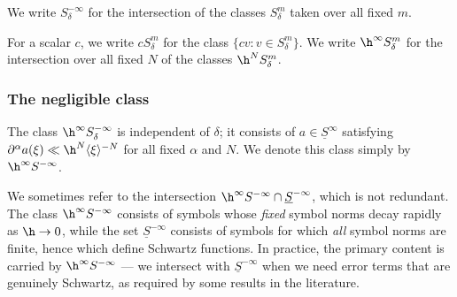 We write $S_{\delta}^{-\infty}$ for the intersection of the classes $S^m_\delta$ taken over all fixed $m$.

For a scalar $c$, we write $c S_\delta^m$ for the class $\{c v : v \in S_\delta^m\}$.  We write $\h^\infty S_\delta^m$ for the intersection over all fixed $N$ of the classes $\h^N S_\delta^m$.

\subsubsection{The negligible class}
The class $\h^\infty S_\delta^{-\infty}$ is independent of $\delta$; it consists of $a \in \underline{S}^\infty$ satisfying $\partial^\alpha a(\xi) \ll \h^N \langle \xi  \rangle^{-N}$ for all fixed $\alpha$ and $N$.  We denote this class simply by $\h^\infty S^{-\infty}$.   

\begin{remark}
  We sometimes refer to the intersection $\h^\infty S^{-\infty} \cap \underline{S}^{-\infty}$, which is not redundant.  The class $\h^\infty S^{-\infty}$ consists of symbols whose \emph{fixed} symbol norms decay rapidly as $\h \rightarrow 0$, while the set $\underline{S}^{-\infty}$ consists of symbols for which \emph{all} symbol norms are finite, hence which define Schwartz functions.  In practice, the primary content is carried by $\h^\infty S^{-\infty}$ --- we intersect with $\underline{S}^{-\infty}$ when we need error terms that are genuinely Schwartz, as required by some results in the literature.
\end{remark}

